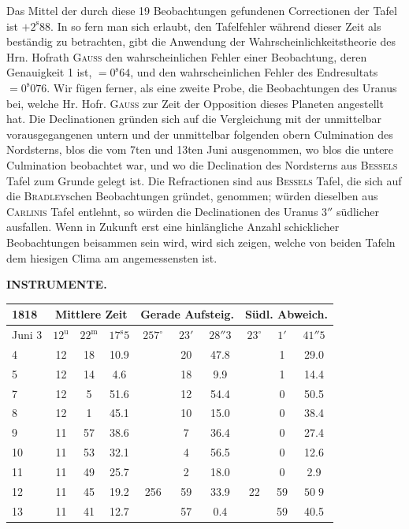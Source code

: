 \par\indent Das Mittel der durch diese 19 Beobachtungen gefundenen Correctionen der Tafel ist $+2^{\mathrm{s}}88$. In
so fern man sich erlaubt, den Tafelfehler während dieser Zeit als beständig zu betrachten, gibt die Anwendung
der Wahrscheinlichkeitstheorie des Hrn. Hofrath \textsc{Gauss} den wahrscheinlichen Fehler einer
Beobachtung, deren Genauigkeit 1 ist, $=0^{\mathrm{s}}64$, und den wahrscheinlichen Fehler des Endresultats
$=0^{\mathrm{s}}076$. Wir fügen ferner, als eine zweite Probe, die Beobachtungen des Uranus bei, welche Hr. Hofr.
\textsc{Gauss} zur Zeit der Opposition dieses Planeten angestellt hat. Die Declinationen gründen sich auf die
Vergleichung mit der unmittelbar vorausgegangenen untern und der unmittelbar folgenden obern Culmination
des Nordsterns, blos die vom 7ten und 13ten Juni ausgenommen, wo blos die untere Culmination
beobachtet war, und wo die Declination des Nordsterns aus \textsc{Bessels} Tafel zum Grunde gelegt
ist. Die Refractionen sind aus \textsc{Bessels} Tafel, die sich auf die \textsc{Bradley}schen Beobachtungen gründet,
genommen; würden dieselben aus \textsc{Carlinis} Tafel entlehnt, so würden die Declinationen des Uranus $3''$
südlicher ausfallen. Wenn in Zukunft erst eine hinlängliche Anzahl schicklicher Beobachtungen beisammen
sein wird, wird sich zeigen, welche von beiden Tafeln dem hiesigen Clima am angemessensten ist.

\clearpage
\noindent{}%
\makebox[12mm][l]{}%
\parbox[t]{\dimexpr\linewidth-24mm\relax}{\centering\footnotesize\bfseries INSTRUMENTE.\par}%
\par\nobreak\medskip
\begin{center}
\setlength{\tabcolsep}{3pt}
\begin{tabular}{l|ccc|ccc|ccc}
\hline
1818 & \multicolumn{3}{c|}{Mittlere Zeit} & \multicolumn{3}{c|}{Gerade Aufsteig.} & \multicolumn{3}{c}{Südl. Abweich.} \\
\hline
Juni 3 & $12^{\mathrm u}$ & $22^{\mathrm m}$ & $17^{\mathrm s}5$ & $257^\circ$ & $23'$ & $28''3$ & $23^\circ$ & $1'$ & $41''5$ \\
4 & 12 & 18 & 10.9 & & 20 & 47.8 & & 1 & 29.0 \\
5 & 12 & 14 & 4.6 & & 18 & 9.9 & & 1 & 14.4 \\
7 & 12 & 5 & 51.6 & & 12 & 54.4 & & 0 & 50.5 \\
8 & 12 & 1 & 45.1 & & 10 & 15.0 & & 0 & 38.4 \\
9 & 11 & 57 & 38.6 & & 7 & 36.4 & & 0 & 27.4 \\
10 & 11 & 53 & 32.1 & & 4 & 56.5 & & 0 & 12.6 \\
11 & 11 & 49 & 25.7 & & 2 & 18.0 & & 0 & 2.9 \\
12 & 11 & 45 & 19.2 & 256 & 59 & 33.9 & 22 & 59 & $50\;9$ \\ 
13 & 11 & 41 & 12.7 & & 57 & 0.4 & & 59 & 40.5 \\
\hline
\end{tabular}
\end{center}

